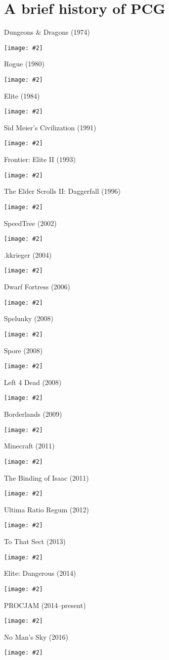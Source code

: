 \part{A brief history of PCG}
\frame{\partpage}

\newcommand{\pictureslideb}[3]{
	\begin{frame}{#1}
		\begin{center}
			#3
			
			\vspace{6pt}
			
			\texttt{[image: \#2]}
		\end{center}
	\end{frame}
}

\newcommand{\pictureslide}[2]{
	\begin{frame}{#1}
		\begin{center}
			\texttt{[image: \#2]}
		\end{center}
	\end{frame}
}

\newcommand{\pictureslidew}[2]{
	\begin{frame}{#1}
		\begin{center}
			\texttt{[image: \#2]}
		\end{center}
	\end{frame}
}

\pictureslide{Dungeons \& Dragons (1974)}{dnd}
\pictureslide{Rogue (1980)}{rogue}
\pictureslide{Elite (1984)}{elite} %
\pictureslide{Sid Meier's Civilization (1991)}{civilization}
\pictureslide{Frontier: Elite II (1993)}{frontier} 
\pictureslide{The Elder Scrolls II: Daggerfall (1996)}{daggerfall} %
\pictureslide{SpeedTree (2002)}{speedtree}
\pictureslide{.kkrieger (2004)}{kkrieger} %
\pictureslide{Dwarf Fortress (2006)}{dwarffortress}
\pictureslide{Spelunky (2008)}{spelunky}
\pictureslide{Spore (2008)}{spore}
\pictureslide{Left 4 Dead (2008)}{left4dead}
\pictureslide{Borderlands (2009)}{borderlands}
\pictureslide{Minecraft (2011)}{minecraft} %
\pictureslide{The Binding of Isaac (2011)}{isaac}
\pictureslide{Ultima Ratio Regum (2012)}{ultimaratioregum}
\pictureslide{To That Sect (2013)}{tothatsect}
\pictureslide{Elite: Dangerous (2014)}{elitedangerous}
\pictureslidew{PROCJAM (2014--present)}{procjam}
\pictureslide{No Man's Sky (2016)}{nomanssky}
